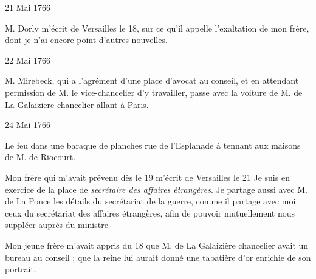                      \begin{diary}{21 Mai 1766}{}
                        
                        
                           M. Dorly m'écrit de Versailles
                           le 18, sur ce
                           qu'il appelle l'exaltation de mon
                              frère, dont
                           je n'ai encore point d'autres nouvelles. \bigskip
        
        
                     \end{diary}

                     \begin{diary}{22 Mai 1766}{}
                        
                        
                           M. Mirebeck, qui a l'agrément d'une
                           place
                           d'avocat au conseil, et en attendant
                           permission de M. le
                              vice-chancelier d'y
                           travailler, passe avec la voiture de M.
                              de La Galaiziere chancelier allant à Paris.
                        \bigskip
        
        
                     \end{diary}

                     \begin{diary}{24 Mai 1766}{}
                        
                         Le feu dans une baraque de planches
                           rue de
                              l'Esplanade à tennant aux maisons de
                           M. de Riocourt.
                        \bigskip
        
        
                        
                           Mon frère qui m'avait
                           prévenu dès le 19
                           m'écrit de Versailles
                           le 21
                           \og Je suis en exercice
                              de la place de \emph{secrétaire des affaires
                                 étrangères}.
                              Je partage aussi avec M. de La
                                 Ponce les détails
                              du secrétariat de la guerre, comme il partage
                              avec moi ceux du secrétariat des affaires
                              étrangères, afin de pouvoir mutuellement
                              nous suppléer auprès du ministre \fg{}
                        \bigskip
        
        
                        
                           Mon jeune frère m'avait appris du 18 que
                           M. de La Galaizière chancelier avait un bureau au conseil
                           ; que la reine lui
                           aurait donné
                           une tabatière d'or enrichie de son portrait. \bigskip
        
        
                     \end{diary}

